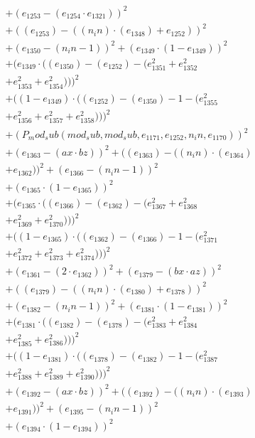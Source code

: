 \documentclass[10pt, a4paper]{article}
\begin{document}
\begin{small}
\begin{align*}
& + (e_{1253} - (e_{1254}  \cdot  e_{1321}))^{2} \\
& + ((e_{1253}) - ((n_in)  \cdot  (e_{1348}) + e_{1252}))^{2} \\
& + (e_{1350} - (n_in - 1))^{2} + (e_{1349}  \cdot  (1 - e_{1349}))^{2} \\
& + (e_{1349}  \cdot  ((e_{1350}) - (e_{1252}) - (e_{1351}^{2} + e_{1352}^{2} \\
& + e_{1353}^{2} + e_{1354}^{2})))^{2} \\
& + ((1 - e_{1349})  \cdot  ((e_{1252}) - (e_{1350}) - 1 - (e_{1355}^{2} \\
& + e_{1356}^{2} + e_{1357}^{2} + e_{1358}^{2})))^{2} \\
& + (P_mod_sub(mod_sub, mod_sub, e_{1171}, e_{1252}, n_in, e_{1170}))^{2} \\
& + (e_{1363} - (ax  \cdot  bz))^{2} + ((e_{1363}) - ((n_in)  \cdot  (e_{1364}) \\
& + e_{1362}))^{2} + (e_{1366} - (n_in - 1))^{2} \\
& + (e_{1365}  \cdot  (1 - e_{1365}))^{2} \\
& + (e_{1365}  \cdot  ((e_{1366}) - (e_{1362}) - (e_{1367}^{2} + e_{1368}^{2} \\
& + e_{1369}^{2} + e_{1370}^{2})))^{2} \\
& + ((1 - e_{1365})  \cdot  ((e_{1362}) - (e_{1366}) - 1 - (e_{1371}^{2} \\
& + e_{1372}^{2} + e_{1373}^{2} + e_{1374}^{2})))^{2} \\
& + (e_{1361} - (2  \cdot  e_{1362}))^{2} + (e_{1379} - (bx  \cdot  az))^{2} \\
& + ((e_{1379}) - ((n_in)  \cdot  (e_{1380}) + e_{1378}))^{2} \\
& + (e_{1382} - (n_in - 1))^{2} + (e_{1381}  \cdot  (1 - e_{1381}))^{2} \\
& + (e_{1381}  \cdot  ((e_{1382}) - (e_{1378}) - (e_{1383}^{2} + e_{1384}^{2} \\
& + e_{1385}^{2} + e_{1386}^{2})))^{2} \\
& + ((1 - e_{1381})  \cdot  ((e_{1378}) - (e_{1382}) - 1 - (e_{1387}^{2} \\
& + e_{1388}^{2} + e_{1389}^{2} + e_{1390}^{2})))^{2} \\
& + (e_{1392} - (ax  \cdot  bz))^{2} + ((e_{1392}) - ((n_in)  \cdot  (e_{1393}) \\
& + e_{1391}))^{2} + (e_{1395} - (n_in - 1))^{2} \\
& + (e_{1394}  \cdot  (1 - e_{1394}))^{2} \\

\end{align*}
\end{small}
\end{document}
